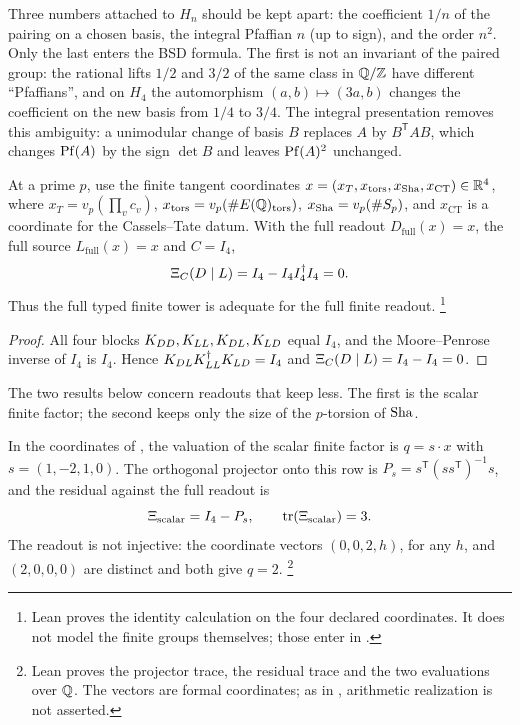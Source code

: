 Three numbers attached to $H_n$ should be kept apart: the coefficient $1/n$
of the pairing on a chosen basis, the integral Pfaffian $n$ (up to sign),
and the order $n^2$.  Only the last enters the BSD formula.  The first is
not an invariant of the paired group: the rational lifts $1/2$ and $3/2$
of the same class in $\mathbb{Q}/\mathbb{Z}$ have different ``Pfaffians'', and on $H_4$
the automorphism $(a,b)\mapsto(3a,b)$ changes the coefficient on the new
basis from $1/4$ to $3/4$.  The integral presentation removes this
ambiguity: a unimodular change of basis $B$ replaces $A$ by
$B^{\mathsf T}AB$, which changes $\operatorname{Pf}(A)$ by the sign $\det B$ and leaves
$\operatorname{Pf}(A)^2$ unchanged.

\begin{theorem}\label{thm:apparatus:finite-source-schur-collapse}
At a prime $p$, use the finite tangent coordinates
$x=(x_T,x_{\operatorname{tors}},x_{\operatorname{Sha}},x_{\mathrm{CT}})\in\mathbb{R}^4$, where
$x_T=v_p(\prod_vc_v)$, $x_{\operatorname{tors}}=v_p(\#E(\mathbb{Q})_{\operatorname{tors}})$,
$x_{\operatorname{Sha}}=v_p(\#S_p)$, and $x_{\mathrm{CT}}$ is a coordinate for the
Cassels--Tate datum.  With the full readout $D_{\mathrm{full}}(x)=x$, the
full source $L_{\mathrm{full}}(x)=x$ and $C=I_4$,
\[
  \Xi_C(D\mid L)=I_4-I_4I_4^{\dagger}I_4=0.
\]
Thus the full typed finite tower is adequate for the full finite
readout.%
\footnote{Lean proves the identity calculation on the four declared
coordinates.  It does not model the finite groups themselves; those
enter in .}
\end{theorem}

\begin{proof}
All four blocks $K_{DD},K_{LL},K_{DL},K_{LD}$ equal $I_4$, and the
Moore--Penrose inverse of $I_4$ is $I_4$.  Hence
$K_{DL}K_{LL}^{\dagger} K_{LD}=I_4$ and $\Xi_C(D\mid L)=I_4-I_4=0$.
\end{proof}

The two results below concern readouts that keep less.  The first is the
scalar finite factor; the second keeps only the size of the $p$-torsion
of $\operatorname{Sha}$.

\begin{theorem}\label{thm:apparatus:scalar-finite-shadow}
In the coordinates of ,
the valuation of the scalar finite factor is $q=s\cdot x$ with
$s=(1,-2,1,0)$.  The orthogonal projector onto this row is
$P_s=s^{\mathsf T}(ss^{\mathsf T})^{-1}s$, and the residual against the
full readout is
\[
  \Xi_{\mathrm{scalar}}=I_4-P_s,
  \qquad
  \operatorname{tr}(\Xi_{\mathrm{scalar}})=3.
\]
The readout is not injective: the coordinate vectors $(0,0,2,h)$, for
any $h$, and $(2,0,0,0)$ are distinct and both give $q=2$.%
\footnote{Lean proves the projector trace, the residual trace and the
two evaluations over $\mathbb{Q}$.  The vectors are formal coordinates; as in
, arithmetic realization
is not asserted.}
\end{theorem}

